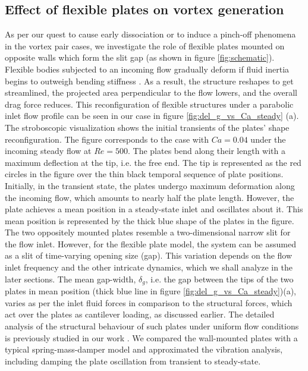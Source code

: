 \documentclass[final,3p,10pt,times,review,authoryear]{elsarticle}
\begin{document}
	\subsection{Effect of flexible plates on vortex generation}
	As per our quest to cause early dissociation or to induce a pinch-off phenomena in the vortex pair cases, we investigate the role of flexible plates mounted on opposite walls which form the slit gap (as shown in figure \ref{fig:schematic}). Flexible bodies subjected to an incoming flow gradually deform if fluid inertia begins to outweigh bending stiffness \citep{Shelley2011}. As a result, the structure reshapes to get streamlined, the projected area perpendicular to the flow lowers, and the overall drag force reduces. This reconfiguration of flexible structures under a parabolic inlet flow profile can be seen in our case in figure \ref{fig:del_g_vs_Ca_steady} (a). The stroboscopic visualization shows the initial transients of the plates' shape reconfiguration. The figure corresponds to the case with $Ca = 0.04$ under the incoming steady flow at $Re=500$. The plates bend along their length with a maximum deflection at the tip, i.e. the free end. The tip is represented as the red circles in the figure over the thin black temporal sequence of plate positions. Initially, in the transient state, the plates undergo maximum deformation along the incoming flow, which amounts to nearly half the plate length. However, the plate achieves a mean position in a steady-state inlet and oscillates about it. This mean position is represented by the thick blue shape of the plates in the figure. The two oppositely mounted plates resemble a two-dimensional narrow slit for the flow inlet. However, for the flexible plate model, the system can be assumed as a slit of time-varying opening size (gap). This variation depends on the flow inlet frequency and the other intricate dynamics, which we shall analyze in the later sections. The mean gap-width, $\delta_g$, i.e. the gap between the tips of the two plates in mean position (thick blue line in figure \ref{fig:del_g_vs_Ca_steady})(a), varies as per the inlet fluid forces in comparison to the structural forces, which act over the plates as cantilever loading, as discussed earlier. The detailed analysis of the structural behaviour of such plates under uniform flow conditions is previously studied in our work \citep{Self2019}. We compared the wall-mounted plates with a typical spring-mass-damper model and approximated the vibration analysis, including damping the plate oscillation from transient to steady-state.
	
\end{document}
